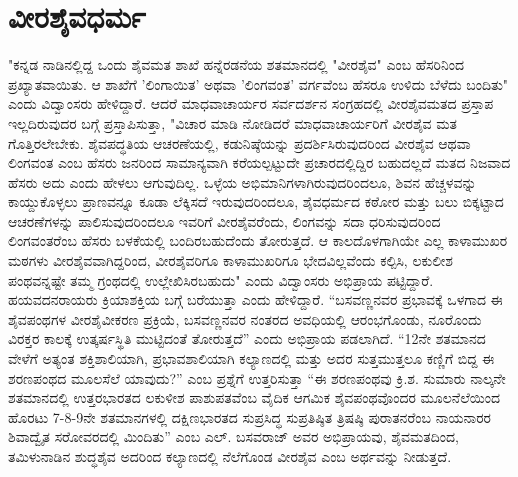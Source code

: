 \section*{ವೀರಶೈವಧರ್ಮ}

 "ಕನ್ನಡ ನಾಡಿನಲ್ಲಿದ್ದ ಒಂದು ಶೈವಮತ ಶಾಖೆ ಹನ್ನೆರಡನೆಯ ಶತಮಾನದಲ್ಲಿ "ವೀರಶೈವ" ಎಂಬ ಹೆಸರಿನಿಂದ ಪ್ರಖ್ಯಾತವಾಯಿತು. ಆ ಶಾಖೆಗೆ ’ಲಿಂಗಾಯಿತ’ ಅಥವಾ ’ಲಿಂಗವಂತ’ ವರ್ಗವೆಂಬ ಹೆಸರೂ ಉಳಿದು ಬೆಳೆದು ಬಂದಿತು" ಎಂದು ವಿದ್ವಾಂಸರು ಹೇಳಿದ್ದಾರೆ. ಆದರೆ ಮಾಧವಾಚಾರ್ಯರ ಸರ್ವದರ್ಶನ ಸಂಗ್ರಹದಲ್ಲಿ ವೀರಶೈವಮತದ ಪ್ರಸ್ತಾಪ ಇಲ್ಲದಿರುವುದರ ಬಗ್ಗೆ ಪ್ರಸ್ತಾಪಿಸುತ್ತಾ, "ವಿಚಾರ ಮಾಡಿ ನೋಡಿದರೆ ಮಾಧವಾಚಾರ್ಯರಿಗೆ ವೀರಶೈವ ಮತ ಗೊತ್ತಿರಲೇಬೇಕು. ಶೈವಪದ್ಧತಿಯ ಆಚರಣೆಯಲ್ಲಿ, ಕಡುನಿಷ್ಠೆಯನ್ನು ಪ್ರದರ್ಶಿಸಿರುವುದರಿಂದ ವೀರಶೈವ ಆಥವಾ ಲಿಂಗವಂತ ಎಂಬ ಹೆಸರು ಜನರಿಂದ ಸಾಮಾನ್ಯವಾಗಿ ಕರೆಯಲ್ಪಟ್ಟುದೇ ಪ್ರಚಾರದಲ್ಲಿದ್ದಿರ ಬಹುದಲ್ಲದೆ ಮತದ ನಿಜವಾದ ಹೆಸರು ಅದು ಎಂದು ಹೇಳಲು ಆಗುವುದಿಲ್ಲ. ಒಳ್ಳೆಯ ಅಭಿಮಾನಿಗಳಾಗಿರುವುದರಿಂದಲೂ, ಶಿವನ ಹೆಚ್ಚಳವನ್ನು ಕಾಯ್ದುಕೊಳ್ಳಲು ಪ್ರಾಣವನ್ನೂ ಕೂಡಾ ಲೆಕ್ಕಿಸದೆ ಇರುವುದರಿಂದಲೂ, ಶೈವಧರ್ಮದ ಕಠೋರ ಮತ್ತು ಬಲು ಬಿಕ್ಕಟ್ಟಾದ ಆಚರಣೆಗಳನ್ನು ಪಾಲಿಸುವುದರಿಂದಲೂ ಇವರಿಗೆ ವೀರಶೈವರೆಂದು, ಲಿಂಗವನ್ನು ಸದಾ ಧರಿಸುವುದರಿಂದ ಲಿಂಗವಂತರೆಂಬ ಹೆಸರು ಬಳಕೆಯಲ್ಲಿ ಬಂದಿರಬಹುದೆಂದು ತೋರುತ್ತದೆ. ಆ ಕಾಲದೊಳಗಾಗಿಯೇ ಎಲ್ಲ ಕಾಳಾಮುಖರ ಮಠಗಳು ವೀರಶೈವವಾಗಿದ್ದರಿಂದ, ವೀರಶೈವರಿಗೂ ಕಾಳಾಮುಖರಿಗೂ ಭೇದವಿಲ್ಲವೆಂದು ಕಲ್ಪಿಸಿ, ಲಕುಲೀಶ ಪಂಥವನ್ನಷ್ಟೇ ತಮ್ಮ ಗ್ರಂಥದಲ್ಲಿ ಉಲ್ಲೇಖಿಸಿರಬಹುದು" ಎಂದು ವಿದ್ವಾಂಸರು ಅಭಿಪ್ರಾಯ ಪಟ್ಟಿದ್ದಾರೆ. ಹಯವದನರಾಯರು ಕ್ರಿಯಾಶಕ್ತಿಯ ಬಗ್ಗೆ ಬರೆಯುತ್ತಾ  ಎಂದು ಹೇಳಿದ್ದಾರೆ. “ಬಸವಣ್ಣನವರ ಪ್ರಭಾವಕ್ಕೆ ಒಳಗಾದ ಈ ಶೈವಪಂಥಗಳ ವೀರಶೈವೀಕರಣ ಪ್ರಕ್ರಿಯೆ, ಬಸವಣ್ಣನವರ ನಂತರದ ಅವಧಿಯಲ್ಲಿ ಆರಂಭಗೊಂಡು, ನೂರೊಂದು ವಿರಕ್ತರ ಕಾಲಕ್ಕೆ ಉತ್ಕರ್ಷಸ್ಥಿತಿ ಮುಟ್ಟಿದಂತೆ ತೋರುತ್ತದೆ” ಎಂದು ಅಭಿಪ್ರಾಯ ಪಡಲಾಗಿದೆ. “12ನೇ ಶತಮಾನದ ವೇಳೆಗೆ ಅತ್ಯಂತ ಶಕ್ತಿಶಾಲಿಯಾಗಿ, ಪ್ರಭಾವಶಾಲಿಯಾಗಿ ಕಲ್ಯಾಣದಲ್ಲಿ ಮತ್ತು ಅದರ ಸುತ್ತಮುತ್ತಲೂ ಕಣ್ಣಿಗೆ ಬಿದ್ದ ಈ ಶರಣಪಂಥದ ಮೂಲಸೆಲೆ ಯಾವುದು?” ಎಂಬ ಪ್ರಶ್ನೆಗೆ ಉತ್ತರಿಸುತ್ತಾ “ಈ ಶರಣಪಂಥವು ಕ್ರಿ.ಶ. ಸುಮಾರು ನಾಲ್ಕನೇ ಶತಮಾನದಲ್ಲಿ ಉತ್ತರಭಾರತದ ಲಕುಳೀಶ ಪಾಶುಪತವೆಂಬ ವೈದಿಕ ಆಗಮಿಕ ಶೈವಪಂಥವೊಂದರ ಮೂಲನೆಲೆಯಿಂದ ಹೊರಟು 7-8-9ನೇ ಶತಮಾನಗಳಲ್ಲಿ ದಕ್ಷಿಣಭಾರತದ ಸುಪ್ರಸಿದ್ಧ ಸುಪ್ರತಿಷ್ಠಿತ ತ್ರಿಷಷ್ಠಿ ಪುರಾತನರೆಂಬ ನಾಯನಾರರ ಶಿವಾದ್ವೈತ ಸರೋವರದಲ್ಲಿ ಮಿಂದಿತು” ಎಂಬ ಎಲ್​. ಬಸವರಾಜ್​ ಅವರ ಅಭಿಪ್ರಾಯವು, ಶೈವಮತದಿಂದ, ತಮಿಳುನಾಡಿನ ಶುದ್ಧಶೈವ ಅದರಿಂದ ಕಲ್ಯಾಣದಲ್ಲಿ ನೆಲೆಗೊಂಡ ವೀರಶೈವ ಎಂಬ ಅರ್ಥವನ್ನು ನೀಡುತ್ತದೆ.

